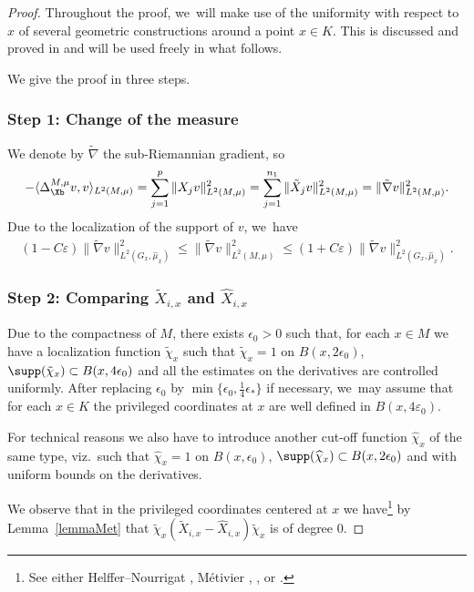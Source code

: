 \begin{proof}
Throughout the proof, we~will make use of the uniformity with respect to~$x$ of several geometric constructions around a point $x\in K$. This is discussed and proved in \cite{Me,HN, HN1,Rot} and will be used freely in what follows.

We give the proof in three steps.

\subsubsection*{Step 1: Change of the measure}
We denote by $\tilde\nabla$ the sub-Riemannian gradient, so
\[
-\langle\Delta_\Xb^{M,\mu} v,v\rangle_{L^2(M,\mu)} = \sum_{j=1}^p \|X_j v\|_{L^2(M,\mu)}^2 = \sum_{j=1}^{n_1} \|\tilde X_j v\|_{L^2(M,\mu)}^2 = \| \tilde\nabla v \|_{L^2(M,\mu)}^2.
\]
Due to the localization of the support of $v$, we~have
\begin{align*}
(1-C\varepsilon) \| \tilde\nabla v \|_{L^2(G_x,\widehat\mu_x)}^2
\leq \| \tilde\nabla v \|_{L^2(M,\mu)}^2
\leq (1+C\varepsilon) \| \tilde\nabla v \|_{L^2(G_x,\widehat\mu_x)}^2.
\end{align*}

\subsubsection*{Step 2: Comparing $\tilde X_{i,x}$ and $\widehat X_{i,x}$}
Due to the compactness of $M$, there exists $\epsilon_0>0$ such that, for each $x\in M$ we have a localization function $\tilde \chi_x$ such that $\tilde \chi_x = 1$ on $B(x, 2\epsilon_0)$, $\supp(\tilde \chi_x) \subset B (x,4\epsilon_0)$ and all the estimates on the derivatives are controlled uniformly. After replacing $\epsilon_0$ by $\min\{\epsilon_0,\frac14\epsilon_*\}$ if necessary, we~may assume that for each $x\in K$ the privileged coordinates at $x$ are well defined in $B(x,4\varepsilon_0)$.

For technical reasons we also have to introduce another cut-off function $\widehat \chi_x$ of the same type, viz.\ such that $\widehat \chi_x = 1$ on $B(x, \epsilon_0)$, $\supp(\widehat \chi_x) \subset B (x,2\epsilon_0)$ and with uniform bounds on the derivatives.

We observe that in the privileged coordinates centered at $x$ we have\footnote{See either Helffer--Nourrigat \cite[Prop.\,5.1]{HN}, Métivier \cite{Me}, \cite[\S 4.2.4]{EL}, or \cite[\S 1]{Rot}.} by Lemma~\ref{lemmaMet} that
$
\tilde \chi_x (\tilde X_{i,x} -\widehat X_{i,x}) \tilde\chi_x
$
is of degree $0$.


\end{proof}
